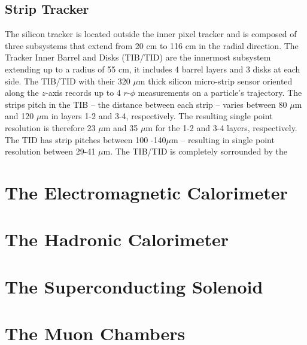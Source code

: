 \subsection{Strip Tracker}
The silicon tracker is located outside the inner pixel tracker and is
composed of three subsystems that extend from 20 cm to 116 cm in the
radial direction. The Tracker Inner Barrel and Disks (TIB/TID) are
the innermost subsystem extending up to a radius of 55 cm, it includes
4 barrel layers and 3 disks at each side. The TIB/TID with their 320
$\mu$m thick silicon micro-strip sensor oriented along the $z$-axis records up to 4 $r$-$\phi$
measurements on a particle's trajectory. The strips pitch  in the TIB -- the
distance between each strip -- varies between 80 $\mu$m and 120 $\mu$m
in layers 1-2 and 3-4, respectively. The resulting single point
resolution is therefore 23 $\mu$m and 35 $\mu$m for the 1-2 and 3-4
layers, respectively. The TID has strip pitches between 100 -140$\mu$m
-- resulting in single point resolution between 29-41 $\mu$m. The
TIB/TID is completely sorrounded by the 
\section{The Electromagnetic Calorimeter}
\section{The Hadronic Calorimeter}
\section{The Superconducting Solenoid}
\section{The Muon Chambers}